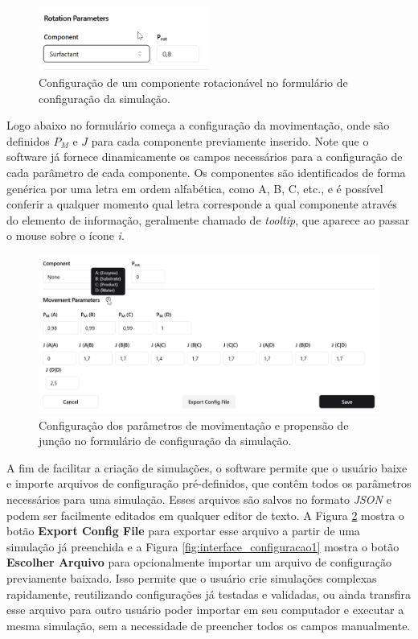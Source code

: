 \documentclass[12pt,oneside]{report}
\begin{document}
\begin{figure}[H]
    \centering
    \includegraphics[width=0.5\textwidth]{img/rotacao_config.png}
    \caption{\small Configuração de um componente rotacionável no formulário de configuração da simulação.}
    \label{fig:interface_rotacao}
\end{figure}

Logo abaixo no formulário começa a configuração da movimentação, onde são definidos $P_M$ e $J$ para cada componente previamente inserido. Note que o software já fornece dinamicamente os campos necessários para a configuração de cada parâmetro de cada componente. Os componentes são identificados de forma genérica por uma letra em ordem alfabética, como A, B, C, etc., e é possível conferir a qualquer momento qual letra corresponde a qual componente através do elemento de informação, geralmente chamado de \textit{tooltip}, que aparece ao passar o mouse sobre o ícone \textit{i}.

\begin{figure}[H]
    \centering
    \includegraphics[width=1\textwidth]{img/mov_config.png}
    \caption{\small Configuração dos parâmetros de movimentação e propensão de junção no formulário de configuração da simulação.}
    \label{fig:interface_movimentacao}
\end{figure}

A fim de facilitar a criação de simulações, o software permite que o usuário baixe e importe arquivos de configuração pré-definidos, que contêm todos os parâmetros necessários para uma simulação. Esses arquivos são salvos no formato \textit{JSON} e podem ser facilmente editados em qualquer editor de texto. A Figura \ref{fig:interface_movimentacao} mostra o botão \textbf{Export Config File} para exportar esse arquivo a partir de uma simulação já preenchida e a Figura \ref{fig:interface_configuracao1} mostra o botão \textbf{Escolher Arquivo} para opcionalmente importar um arquivo de configuração previamente baixado. Isso permite que o usuário crie simulações complexas rapidamente, reutilizando configurações já testadas e validadas, ou ainda transfira esse arquivo para outro usuário poder importar em seu computador e executar a mesma simulação, sem a necessidade de preencher todos os campos manualmente.
\end{document}

